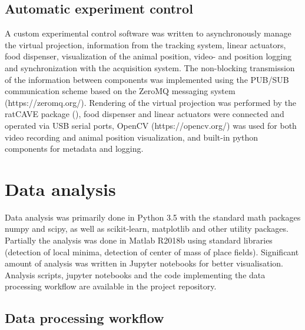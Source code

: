 \subsection{Automatic experiment control}

A custom experimental control software was written to asynchronously manage the virtual projection, information from the tracking system, linear actuators, food dispenser, visualization of the animal position, video- and position logging and synchronization with the acquisition system. The non-blocking transmission of the information between components was implemented using the PUB/SUB communication scheme based on the ZeroMQ messaging system (https://zeromq.org/). Rendering of the virtual projection was performed by the ratCAVE package (\cite{Grosso2019}), food dispenser and linear actuators were connected and operated via USB serial ports, OpenCV (https://opencv.org/) was used for both video recording and animal position visualization, and built-in python components for metadata and logging.


\section{Data analysis}

Data analysis was primarily done in Python 3.5 with the standard math packages numpy and scipy, as well as scikit-learn, matplotlib and other utility packages. Partially the analysis was done in Matlab R2018b using standard libraries (detection of local minima, detection of center of mass of place fields). Significant amount of analysis was written in Jupyter notebooks for better visualisation. Analysis scripts, jupyter notebooks and the code implementing the data processing workflow are available in the project repository.


\subsection{Data processing workflow}

